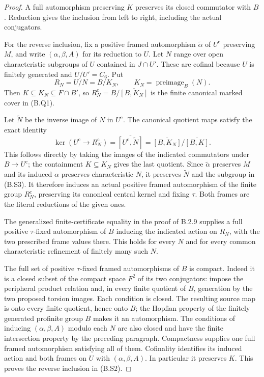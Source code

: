 \begin{proof}
A full automorphism preserving $K$ preserves its closed
commutator with $B$.  Reduction gives the inclusion from
left to right, including the actual conjugators.

For the reverse inclusion, fix a positive framed
automorphism $\widetilde\alpha$ of $U^{\mathrm c}$
preserving $M$, and write $(\alpha,\beta,A)$ for its
reduction to $U$.  Let $N$ range over open characteristic
subgroups of $U$ contained in $J\cap U'$.  These are
cofinal because $U$ is finitely generated and
$U/U'=C_6$.  Put
\[
 R_N=U/N=B/K_N,\qquad
 K_N=\operatorname{preimage}_B(N).
\]
Then $K\subseteq K_N\subseteq F\cap B'$, so
$R_N^{\mathrm c}=B/\overline{[B,K_N]}$ is the finite
canonical marked cover in (B.Q1).

Let $\widetilde N$ be the inverse image of $N$ in
$U^{\mathrm c}$.  The canonical quotient maps satisfy
the exact identity
\[
 \ker(U^{\mathrm c}\longrightarrow R_N^{\mathrm c})
       =\overline{[U^{\mathrm c},\widetilde N]}
       =\overline{[B,K_N]}/\overline{[B,K]}.                    \tag{B.S3}
\]
This follows directly by taking the images of the indicated
commutators under $B\to U^{\mathrm c}$; the containment
$K\subseteq K_N$ gives the last quotient.  Since
$\widetilde\alpha$ preserves $M$ and its induced
$\alpha$ preserves characteristic $N$, it preserves
$\widetilde N$ and the subgroup in (B.S3).  It therefore
induces an actual positive framed automorphism of the
finite group $R_N^{\mathrm c}$, preserving its canonical
central kernel and fixing $\tau$.  Both frames are the
literal reductions of the given ones.

The generalized finite-certificate equality in the proof
of B.2.9 supplies a full positive $\tau$-fixed automorphism
of $B$ inducing the indicated action on $R_N$, with the
two prescribed frame values there.  This holds for every
$N$ and for every common characteristic refinement of
finitely many such $N$.

The full set of positive $\tau$-fixed framed automorphisms
of $B$ is compact.  Indeed it is a closed subset of the
compact space $F^2$ of its two conjugators: impose the
peripheral product relation and, in every finite quotient
of $B$, generation by the two proposed torsion images.
Each condition is closed.  The resulting source map is
onto every finite quotient, hence onto $B$; the Hopfian
property of the finitely generated profinite group $B$
makes it an automorphism.  The conditions of inducing
$(\alpha,\beta,A)$ modulo each $N$ are also closed and
have the finite intersection property by the preceding
paragraph.  Compactness supplies one full framed
automorphism satisfying all of them.  Cofinality identifies
its induced action and both frames on $U$ with
$(\alpha,\beta,A)$.  In particular it preserves $K$.
This proves the reverse inclusion in (B.S2).
\end{proof}

